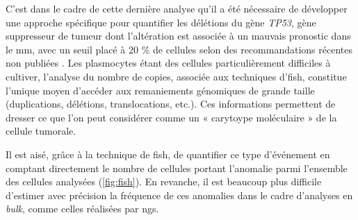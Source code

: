\vspace{1em}

C'est dans le cadre de cette dernière analyse qu'il a été nécessaire de développer une approche spécifique pour quantifier les délétions du gène \textit{TP53}, 
gène suppresseur de tumeur dont l'altération est associée à un mauvais pronostic dans le \gls{mm}, avec un seuil placé à 20 \% de cellules selon des recommandations 
récentes non publiées \cite{flyntPrognosisBiologyTargeting2020}.
Les plasmocytes étant des cellules particulièrement difficiles à cultiver, l'analyse du nombre de copies, associée aux techniques d'\gls{fish}, constitue l'unique 
moyen d'accéder aux remaniements génomiques de grande taille (duplications, délétions, translocations, etc.).
Ces informations permettent de dresser ce que l'on peut considérer comme un « carytoype moléculaire » de la cellule tumorale. 

\vspace{1em}

Il est aisé, grâce à la technique de \gls{fish}, de quantifier ce type d'événement en comptant directement le nombre de cellules portant l'anomalie parmi l'ensemble des cellules analysées 
(\autoref{fig:fish}).  
En revanche, il est beaucoup plus difficile d'estimer avec précision la fréquence de ces anomalies dans le cadre d'analyses en \textit{bulk}, comme celles réalisées par \gls{ngs}.

